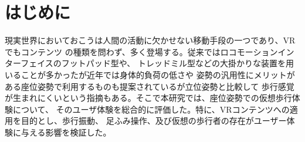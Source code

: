 \documentclass[uplatex]{jsarticle}   %
\begin{document}

\vspace{3mm}

\setcounter{page}{x}



\section{はじめに}
現実世界においておこうは人間の活動に欠かせない移動手段の一つであり、VRでもコンテンツ
の種類を問わず、多く登場する。従来ではロコモーションインターフェイスのフットパッド型や、
トレッドミル型などの大掛かりな装置を用いることが多かったが近年では身体的負荷の低さや
姿勢の汎用性にメリットがある座位姿勢で利用するものも提案されているが立位姿勢と比較して
歩行感覚が生まれにくいという指摘もある。そこで本研究では、座位姿勢での仮想歩行体験について、
そのユーザ体験を総合的に評価した。特に、VRコンテンツへの適用を目的とし、歩行振動、
足ふみ操作、及び仮想の歩行者の存在がユーザー体験に与える影響を検証した。






\end{document}
